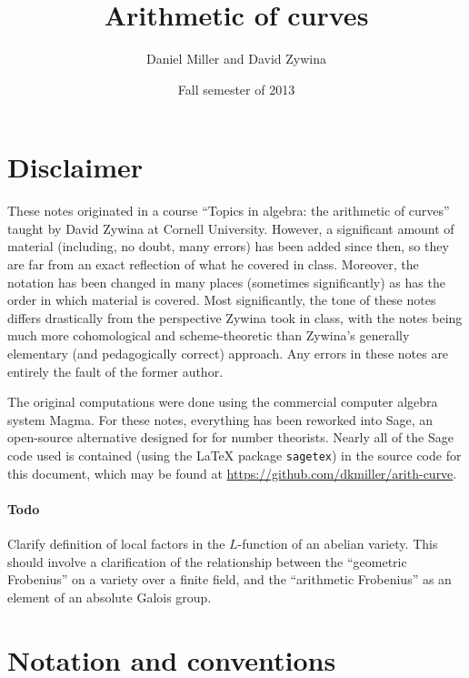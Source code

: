 \documentclass{article}
\title{Arithmetic of curves}
\author{Daniel Miller and David Zywina}
\date{Fall semester of 2013}
\begin{document}
\maketitle
\tableofcontents





\newpage
\section*{Disclaimer}

These notes originated in a course ``Topics in algebra: the arithmetic of 
curves'' taught by David Zywina at Cornell University. However, a significant 
amount of material (including, no 
doubt, many errors) has been added since then, so they are far from an exact 
reflection of what he covered in class. Moreover, the notation has been changed 
in many places (sometimes significantly) as has the order in which material is 
covered. Most significantly, the tone of these notes differs drastically 
from the perspective Zywina took in class, with the notes being much more 
cohomological and scheme-theoretic than Zywina's generally elementary (and 
pedagogically correct) approach. Any errors in these notes are entirely the 
fault of the former author. 

The original computations were done using the commercial 
computer algebra system Magma. For these notes, everything has been reworked 
into Sage, an open-source alternative designed for for number theorists. Nearly 
all of the Sage code used is contained (using the \LaTeX{} package 
\texttt{sagetex}) in the source code for this document, which may be found at 
\url{https://github.com/dkmiller/arith-curve}. 


\paragraph{Todo}
Clarify definition of local factors in the $L$-function of an abelian variety. 
This should involve a clarification of the relationship between the ``geometric 
Frobenius'' on a variety over a finite field, and the ``arithmetic Frobenius'' 
as an element of an absolute Galois group. 





\section*{Notation and conventions}
\end{document}
